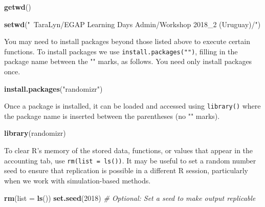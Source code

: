 \documentclass[12pt,]{book}
\newenvironment{Shaded}{\begin{snugshade}}{\end{snugshade}}
\newcommand{\CommentTok}[1]{\textcolor[rgb]{0.56,0.35,0.01}{\textit{#1}}}
\newcommand{\DataTypeTok}[1]{\textcolor[rgb]{0.13,0.29,0.53}{#1}}
\newcommand{\DecValTok}[1]{\textcolor[rgb]{0.00,0.00,0.81}{#1}}
\newcommand{\KeywordTok}[1]{\textcolor[rgb]{0.13,0.29,0.53}{\textbf{#1}}}
\newcommand{\NormalTok}[1]{#1}
\newcommand{\StringTok}[1]{\textcolor[rgb]{0.31,0.60,0.02}{#1}}
\begin{document}
\begin{Shaded}
\begin{Highlighting}[]
\KeywordTok{getwd}\NormalTok{()}
\end{Highlighting}
\end{Shaded}

\begin{Shaded}
\begin{Highlighting}[]
\KeywordTok{setwd}\NormalTok{(}\StringTok{"~TaraLyn/EGAP Learning Days Admin/Workshop 2018_2 (Uruguay)/"}\NormalTok{)   }
\end{Highlighting}
\end{Shaded}

You may need to install packages beyond those listed above to execute certain functions. To install packages we use \texttt{install.packages("")}, filling in the package name between the "" marks, as follows. You need only install packages once.

\begin{Shaded}
\begin{Highlighting}[]
\KeywordTok{install.packages}\NormalTok{(}\StringTok{"randomizr"}\NormalTok{)  }
\end{Highlighting}
\end{Shaded}

Once a package is installed, it can be loaded and accessed using \texttt{library()} where the package name is inserted between the parentheses (no "" marks).

\begin{Shaded}
\begin{Highlighting}[]
\KeywordTok{library}\NormalTok{(randomizr)}
\end{Highlighting}
\end{Shaded}

To clear R's memory of the stored data, functions, or values that appear in the accounting tab, use \texttt{rm(list\ =\ ls())}. It may be useful to set a random number seed to ensure that replication is possible in a different R session, particularly when we work with simulation-based methods.

\begin{Shaded}
\begin{Highlighting}[]
\KeywordTok{rm}\NormalTok{(}\DataTypeTok{list =} \KeywordTok{ls}\NormalTok{())                                   }
\KeywordTok{set.seed}\NormalTok{(}\DecValTok{2018}\NormalTok{)  }\CommentTok{# Optional: Set a seed to make output replicable}
\end{Highlighting}
\end{Shaded}
\end{document}
